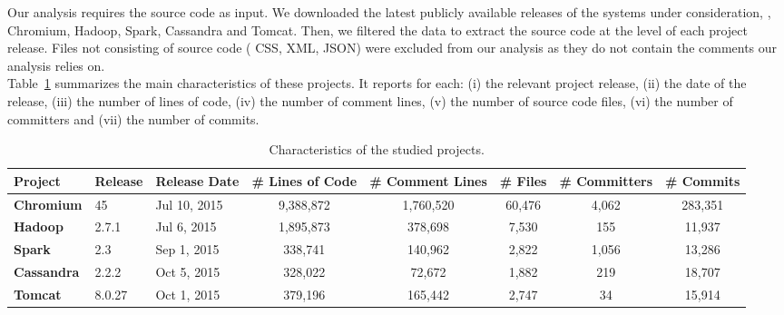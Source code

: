 Our analysis requires the source code as input. We downloaded the latest publicly available releases of the systems under consideration, \ie{}, Chromium, Hadoop, Spark, Cassandra and Tomcat. Then, we filtered the data to extract the source code at the level of each project release. Files not consisting of source code (\eg{} CSS, XML, JSON) were excluded from our analysis as they do not contain the comments our analysis relies on.\\

Table~\ref{table:projects_statistics} summarizes the main characteristics of these projects. It reports for each: (i) the relevant project release, (ii) the date of the release, (iii) the number of lines of code, (iv)  the number of comment lines, (v)  the number of source code files, (vi)  the number of committers and (vii) the number of commits.

	
\begin{table}[t]


		\centering
		\caption{Characteristics of the studied projects.}
				\begin{adjustbox}{width=1.0\textwidth}
		\begin{tabular}{l|ll|ccccc}
			\hline
			\textbf{Project}  & \textbf{Release} & \textbf{ Release Date}  & \textbf{\# Lines of Code} & \textbf{\# Comment Lines} & \textbf{\# Files} & \textbf{\# Committers} & \textbf{\# Commits} \\ \hline
			\textbf{Chromium} &   45    & Jul 10, 2015 &  9,388,872   &    1,760,520    & 60,476 &    4,062    & 283,351  \\ \hline
			\textbf{Hadoop} &   2.7.1    & Jul 6, 2015 &  1,895,873   &    378,698    & 7,530 &    155    & 11,937  \\ \hline
			\textbf{Spark} &   2.3    & Sep 1, 2015 &  338,741   &    140,962    & 2,822 &    1,056    & 13,286  \\ \hline
			\textbf{Cassandra} &   2.2.2    & Oct 5, 2015 &  328,022   &    72,672    & 1,882 &    219    & 18,707  \\ \hline
			\textbf{Tomcat} &   8.0.27    & Oct 1, 2015 &  379,196   &    165,442    & 2,747 &    34    & 15,914  \\ \hline
		\end{tabular}
		\label{table:projects_statistics}
	\end{adjustbox}
\end{table}

